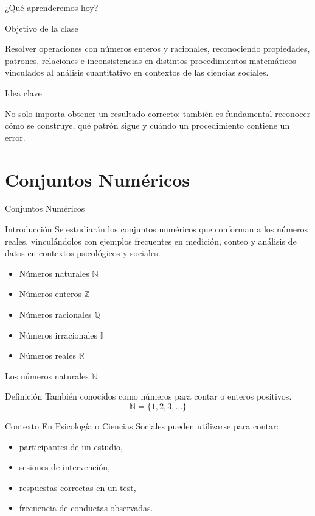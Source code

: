 \documentclass[aspectratio=169,10pt]{beamer}
\newcommand{\IdeaClave}[1]{
	\begin{exampleblock}{Idea clave}
		#1
	\end{exampleblock}
}
\newcommand{\ObjetivoClase}[1]{
	\begin{block}{Objetivo de la clase}
		#1
	\end{block}
}
\begin{document}
	\begin{frame}{¿Qué aprenderemos hoy?}
		\ObjetivoClase{
			Resolver operaciones con números enteros y racionales, reconociendo propiedades, patrones, relaciones e inconsistencias en distintos procedimientos matemáticos vinculados al análisis cuantitativo en contextos de las ciencias sociales.
		}
		
		\IdeaClave{
			No solo importa obtener un resultado correcto: también es fundamental reconocer cómo se construye, qué patrón sigue y cuándo un procedimiento contiene un error.
		}
	\end{frame}
	
	\section{Conjuntos Numéricos}
	
	\begin{frame}{Conjuntos Numéricos}
		\begin{block}{Introducción}
			Se estudiarán los conjuntos numéricos que conforman a los números reales, vinculándolos con ejemplos frecuentes en medición, conteo y análisis de datos en contextos psicológicos y sociales.
		\end{block}
		
		\begin{itemize}[<+->]
			\item Números naturales \(\mathbb{N}\)
			\item Números enteros \(\mathbb{Z}\)
			\item Números racionales \(\mathbb{Q}\)
			\item Números irracionales \(\mathbb{I}\)
			\item Números reales \(\mathbb{R}\)
		\end{itemize}
	\end{frame}
	
	\begin{frame}{Los números naturales \(\mathbb{N}\)}
		\begin{block}{Definición}
			También conocidos como números para contar o enteros positivos.
			\[
			\mathbb{N}=\{1,2,3,\dots\}
			\]
		\end{block}
		
		\begin{exampleblock}{Contexto}
			En Psicología o Ciencias Sociales pueden utilizarse para contar:
			\begin{itemize}
				\item participantes de un estudio,
				\item sesiones de intervención,
				\item respuestas correctas en un test,
				\item frecuencia de conductas observadas.
			\end{itemize}
		\end{exampleblock}
	\end{frame}
	
\end{document}
